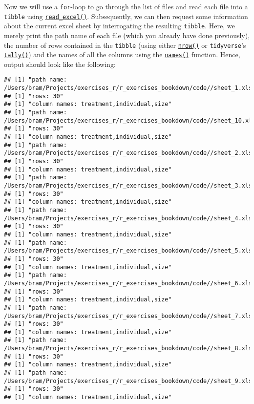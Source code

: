 \documentclass[
]{book}
\begin{document}
Now we will use a \texttt{for}-loop to go through the list of files and read each file into a \texttt{tibble} using \href{https://readxl.tidyverse.org/reference/read_excel.html}{\texttt{read\_excel()}}. Subsequently, we can then request some information about the current excel sheet by interrogating the resulting \texttt{tibble}. Here, we merely print the path name of each file (which you already have done previously), the number of rows contained in the \texttt{tibble} (using either \href{https://stat.ethz.ch/R-manual/R-patched/library/base/html/nrow.html}{\texttt{nrow()}} or \texttt{tidyverse}'s \href{https://dplyr.tidyverse.org/reference/tally.html}{\texttt{tally()}}) and the names of all the columns using the \href{https://stat.ethz.ch/R-manual/R-patched/library/base/html/names.html}{\texttt{names()}} function. Hence, output should look like the following:

\begin{verbatim}
## [1] "path name: /Users/bram/Projects/exercises_r/r_exercises_bookdown/code//sheet_1.xls"
## [1] "rows: 30"
## [1] "column names: treatment,individual,size"
## [1] "path name: /Users/bram/Projects/exercises_r/r_exercises_bookdown/code//sheet_10.xls"
## [1] "rows: 30"
## [1] "column names: treatment,individual,size"
## [1] "path name: /Users/bram/Projects/exercises_r/r_exercises_bookdown/code//sheet_2.xls"
## [1] "rows: 30"
## [1] "column names: treatment,individual,size"
## [1] "path name: /Users/bram/Projects/exercises_r/r_exercises_bookdown/code//sheet_3.xls"
## [1] "rows: 30"
## [1] "column names: treatment,individual,size"
## [1] "path name: /Users/bram/Projects/exercises_r/r_exercises_bookdown/code//sheet_4.xls"
## [1] "rows: 30"
## [1] "column names: treatment,individual,size"
## [1] "path name: /Users/bram/Projects/exercises_r/r_exercises_bookdown/code//sheet_5.xls"
## [1] "rows: 30"
## [1] "column names: treatment,individual,size"
## [1] "path name: /Users/bram/Projects/exercises_r/r_exercises_bookdown/code//sheet_6.xls"
## [1] "rows: 30"
## [1] "column names: treatment,individual,size"
## [1] "path name: /Users/bram/Projects/exercises_r/r_exercises_bookdown/code//sheet_7.xls"
## [1] "rows: 30"
## [1] "column names: treatment,individual,size"
## [1] "path name: /Users/bram/Projects/exercises_r/r_exercises_bookdown/code//sheet_8.xls"
## [1] "rows: 30"
## [1] "column names: treatment,individual,size"
## [1] "path name: /Users/bram/Projects/exercises_r/r_exercises_bookdown/code//sheet_9.xls"
## [1] "rows: 30"
## [1] "column names: treatment,individual,size"
\end{verbatim}
\end{document}
